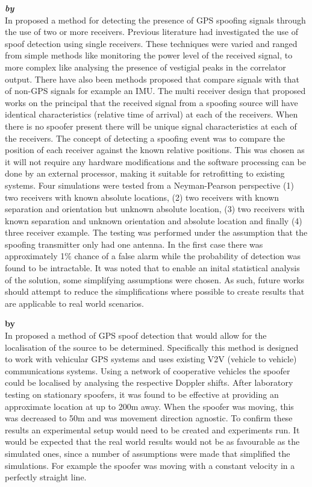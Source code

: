 \textbf{\emph{ by \citeauthor{RN10}}} \\
In \citeyear{RN10} \citeauthor{RN10} \cite{RN10} proposed a method for detecting the presence of GPS spoofing signals through the use of two or more receivers. Previous
literature had investigated the use of spoof detection using single receivers. These techniques were varied and ranged from simple methods like monitoring the power level
of the received signal, to more complex like analysing the presence of vestigial peaks in the correlator output. There have also been methods proposed that compare
signals with that of non-GPS signals for example an IMU. The multi receiver design that \citeauthor{RN10} proposed works on the principal that the received signal from a
spoofing source will have identical characteristics (relative time of arrival) at each of the receivers. When there is no spoofer present there will be unique signal
characteristics at each of the receivers. The concept of detecting a spoofing event was to compare the position of each receiver against the known relative positions. This
was chosen as it will not require any hardware modifications and the software processing can be done by an external processor, making it suitable for retrofitting to
existing systems. Four simulations were tested from a Neyman-Pearson perspective (1) two receivers with known
absolute locations, (2) two receivers with known separation and orientation but unknown absolute location, (3) two receivers with known separation and unknown orientation
and absolute location and finally (4) three receiver example. The testing was performed under the assumption that the spoofing transmitter only had one antenna. In the
first case there was approximately 1\% chance of a false alarm while the probability of detection was found to be intractable.
It was noted that to enable an inital statistical analysis of the solution, some simplifying assumptions were chosen. As such, future works should attempt to reduce the
simplifications where possible to create results that are applicable to real world scenarios.

\medskip

\textbf{\emph{} by \citeauthor{RN1}} \\
In \citeyear{RN1} \citeauthor{RN1} \cite{RN1} proposed a method of GPS spoof detection that would allow for the localisation
of the source to be determined. Specifically this method is designed to work with vehicular GPS systems and uses existing 
V2V (vehicle to vehicle) communications systems. Using a network of cooperative vehicles the spoofer could be localised by analysing the respective
Doppler shifts. After laboratory testing on stationary spoofers, it was found to be effective at providing an approximate location at up to 200m away.
When the spoofer was moving, this was decreased to 50m and was movement direction agnostic. To confirm these results an experimental setup would need
to be created and experiments run. It would be expected that the real world results would not be as favourable as the simulated ones, since a number of
assumptions were made that simplified the simulations. For example the spoofer was moving with a constant velocity in a perfectly straight line.

